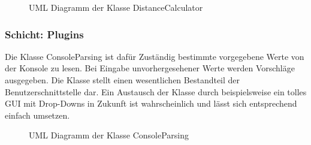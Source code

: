 \begin{figure}[H]
  \centering
  
  \caption{UML Diagramm der Klasse DistanceCalculator}
\end{figure}

\subsubsection{Schicht: Plugins}

Die Klasse ConsoleParsing ist dafür Zuständig bestimmte vorgegebene Werte von der Konsole zu lesen. Bei Eingabe unvorhergesehener Werte werden Vorschläge ausgegeben.
Die Klasse stellt einen wesentlichen Bestandteil der Benutzerschnittstelle dar. Ein Austausch der Klasse durch beispielsweise ein tolles GUI mit Drop-Downs in Zukunft ist wahrscheinlich und lässt sich entsprechend einfach umsetzen.

\begin{figure}[H]
  \centering
  
  \caption{UML Diagramm der Klasse ConsoleParsing}
\end{figure}


